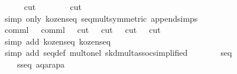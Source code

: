 \begin{isabellebody}
\ \ \ \ \isamarkupfalse%
\ {}cut\ {}\ {}{}\isanewline
\ \ \ \ \isamarkupfalse%
\ {}cut\ {}\ {}{}\isanewline
\ \ \ \ \isamarkupfalse%
\ {}simp\ only{}\ kozen{}{}seq\ seq{}mult{}symmetric{}\ append{}simps{}\isanewline
\ \ \ \ \isamarkupfalse%
\ {}comml{}\ {}\ {}{}\ comml{}\ {}\ {}{}\ cut\ {}\ {}{}\ cut\ {}\ {}{}\ cut\ {}\ {}{}\ cut\ {}\ {}{}\isanewline
\ \ \ \ \isamarkupfalse%
\ {}simp\ add{}\ kozen{}{}seq{}\ kozen{}{}seq{}{}\isanewline
\ \ \ \ \isamarkupfalse%
\ {}simp\ add{}\ seq{}def\ mult{}onel\ skd{}mult{}assoc{}simplified{}{}\isanewline
\isanewline
\ \ \isamarkupfalse%
\ \isamarkupfalse%
\ {}{}{}{}\ {}\ seq\isanewline
\ \ \ \ {}s{}{}{}seq\ {}a{}{}q{}{}{}{}{}a{}{}r{}{}{}{}{}a{}{}p{}{}{}a{}{}{}\isanewline

\end{isabellebody}
